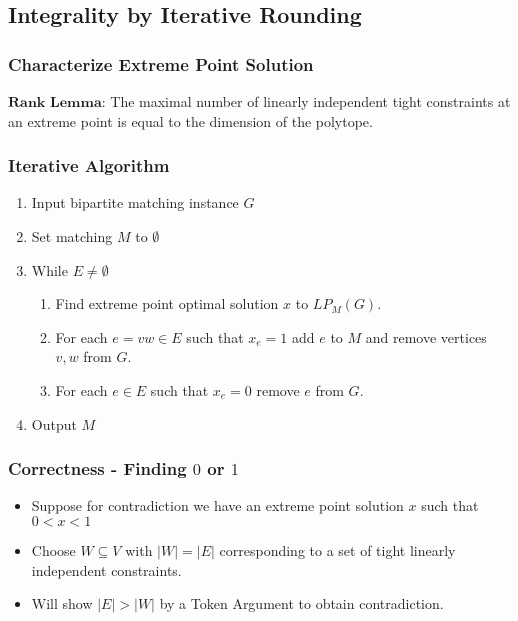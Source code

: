 \documentclass{beamer}
\begin{document}
\subsection{Integrality by Iterative Rounding}
\begin{frame}
\frametitle{Characterize Extreme Point Solution}
$\textbf{Rank Lemma:}$ The maximal number of linearly independent tight constraints at an extreme point is equal to the dimension of the polytope.\\
\end{frame}

\begin{frame}
\frametitle{Iterative Algorithm}
\begin{enumerate}
\item Input bipartite matching instance $G$
\item Set matching $M$ to $\emptyset$
\item While $E \neq \emptyset$
\begin{enumerate}
\item Find extreme point optimal solution $x$ to $LP_M(G)$.
\item For each $e=vw \in E$ such that $x_e = 1$ add $e$ to $M$ and remove vertices $v,w$ from $G$.
\item For each $e \in E$ such that $x_e = 0$ remove $e$ from $G$.
\end{enumerate}
\item Output $M$
\end{enumerate}
\end{frame}

\begin{frame}
\frametitle{Correctness - Finding $0$ or $1$}
\begin{itemize}
\item<1-> Suppose for contradiction we have an extreme point solution $x$ such that $0 < x < 1$
\item<2-> Choose $W \subseteq V$ with $|W| = |E|$ corresponding to a set of tight linearly independent constraints.
\item<3-> Will show $|E| > |W|$ by a Token Argument to obtain contradiction.
\end{itemize}
\end{frame}
\end{document}
